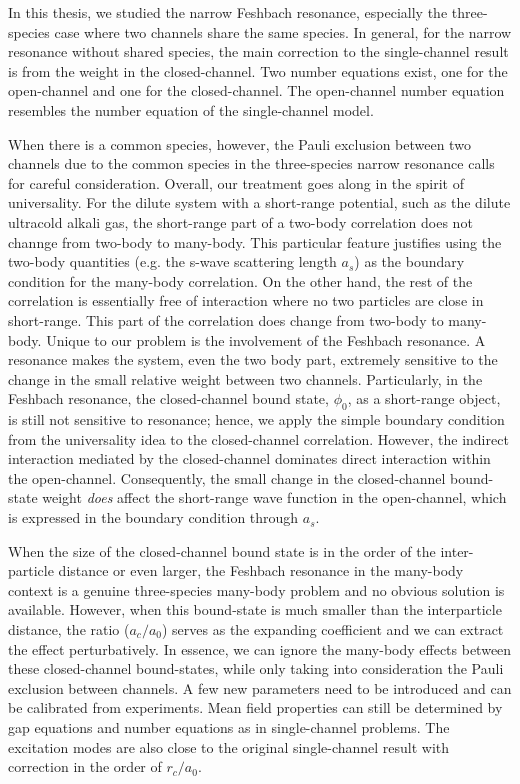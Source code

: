 % 
In this thesis, we studied the narrow Feshbach resonance, especially the three-species case where two channels share the same species.  In general, for the narrow resonance without shared species, the main correction to the single-channel result is from the weight in the closed-channel.  Two number equations exist, one for the open-channel and one for the closed-channel.  The open-channel number equation resembles the number equation of the single-channel model.

When there is a common species,  however, the  Pauli exclusion between two channels due to the common species in the three-species narrow resonance calls for careful  consideration.  Overall, our treatment goes along in the spirit of universality.  For the dilute system with a short-range potential, such as the dilute ultracold alkali gas, the short-range part of a two-body correlation does not channge from two-body  to many-body.  This particular feature justifies using the two-body quantities (e.g. the s-wave scattering length $a_{s}$) as the boundary condition for the many-body correlation.  On the other hand, the rest of the correlation is essentially free of interaction where no two particles are close in short-range. This part of the correlation does change from two-body to many-body.  Unique to our problem is the involvement of the Feshbach resonance.  A resonance makes the system, even the two body part, extremely sensitive to the change in the small relative weight between two channels. Particularly, in the Feshbach resonance, the closed-channel bound state, $\phi_{0}$, as a short-range object,  is still not sensitive to resonance; hence, we apply the simple boundary condition from the universality idea to the closed-channel correlation. However, the indirect interaction mediated by the closed-channel dominates direct interaction within the open-channel. Consequently, the small change in the closed-channel bound-state weight \emph{does} affect the short-range wave function in the open-channel, which is expressed in the boundary condition through $a_{s}$. 

When the size of  the closed-channel bound state is  in the order of the   inter-particle distance or even larger, the Feshbach resonance in the many-body context is a genuine three-species many-body problem and no obvious solution is available.  However, when this bound-state is much smaller than the interparticle distance, the ratio ($a_{c}/a_{0}$) serves as the expanding coefficient and we can extract  the effect perturbatively.  In essence, we can ignore the many-body effects between these closed-channel bound-states, while only taking into consideration  the Pauli exclusion between channels.  A few new parameters need to be introduced and can be calibrated from experiments.  Mean field properties can still be determined by gap equations and number equations as in single-channel problems.  The excitation modes are also close to the original single-channel result with correction in the order of $r_{c}/a_{0}$.

